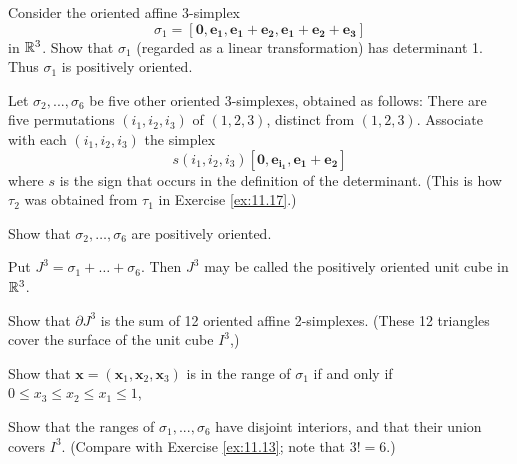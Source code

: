 \begin{myexercise}    
    \label{ex:10.18}
    Consider the oriented affine 3-simplex 
    \begin{equation*}
        \sigma_1 =  \left[ \mathbf{0,e_1,e_1+e_2,e_1+e_2+e_3} \right]
    \end{equation*}
    in ${\protect\mathbb R}^3$.
    Show that $\sigma_1$
    (regarded as a linear transformation) has determinant 1.
    Thus $\sigma_1$ is positively oriented.

    Let $\sigma_2 , ... , \sigma_6$ be five other oriented 3-simplexes, obtained as follows: 
    There are five permutations $(i_1, i_2, i_3)$ of $(1, 2, 3)$, distinct from $(1, 2, 3)$. 
    Associate with each $(i_1, i_2, i_3)$ the simplex 
    \begin{equation*}
        s(i_1, i_2, i_3) \left[ \mathbf{0,e_{i_1},e_1+e_2} \right]
    \end{equation*}
    where $s$ is the sign that occurs in the definition of the determinant. 
    (This is how $\tau_2$ was obtained from $\tau_1$ in Exercise \ref{ex:11.17}.)
    
    Show that $\sigma_2, \dots , \sigma_6$ are positively oriented.
    
    Put $J^3 = \sigma_1 + \dots + \sigma_6$. 
    Then $J^3$ may be called the positively oriented unit cube in ${\protect\mathbb R}^3$. 

    Show that $\partial J^3$ is the sum of 12 oriented affine 2-simplexes. 
    (These 12 triangles cover the surface of the unit cube $I^3$,)

    Show that $\mathbf{x} = (\mathbf{x}_1, \mathbf{x}_2, \mathbf{x}_3)$ is in the range of $\sigma_1$ if and only if $0 \leq x_3 \leq x_2 \leq x_1 \leq 1$,

    Show that the ranges of $\sigma_1, ... , \sigma_6$ have disjoint interiors, and that their union covers $I^3$. 
    (Compare with Exercise \ref{ex:11.13}; note that $3! = 6$.)
\end{myexercise}


\begin{myexercise}    
    \label{ex:10.19}
\end{myexercise}



\begin{myexercise}    
    \label{ex:10.20}
\end{myexercise}


\begin{myexercise}    
    \label{ex:10.21}
\end{myexercise}



